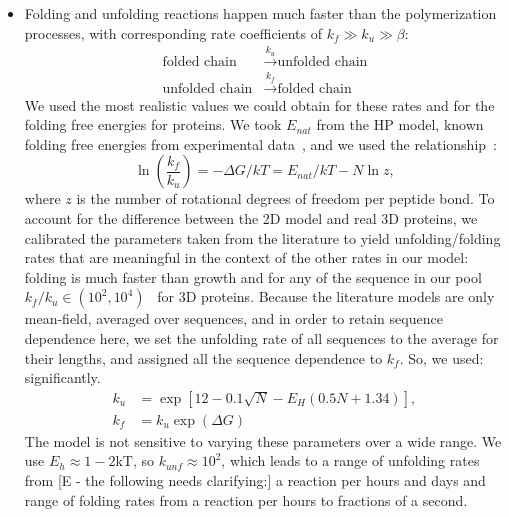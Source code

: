 \documentclass[5p,times]{elsarticle}
\newcommand*{\gD}{\Delta}
\newcommand*{\pt}[1]{\left( #1\right)}
\begin{document}
\begin{itemize}
\item Folding and unfolding reactions happen much faster than the polymerization processes, with 
corresponding rate coefficients of $k_f\gg k_{u}\gg\beta$:
\begin{equation}
\begin{split}
 \mbox{folded chain}&\xrightarrow{k_u}\mbox{unfolded chain}  \\
 \mbox{unfolded chain}&\xrightarrow{k_f}\mbox{folded chain}
\end{split}
\end{equation}
 We used the most realistic values we could obtain for these rates and for the folding free 
energies for proteins.  We took $E_{nat}$ from the HP model, known folding free energies from 
experimental data~\cite{Ghosh2010,Dill2011}, and we used the relationship~\cite{Ghosh2009}:
\begin{equation}
 \ln\pt{\frac{k_f}{k_u}}=-\gD G/kT = E_{nat}/kT-N\ln z,
\end{equation} 
 where $z$ is the number of rotational degrees of freedom per peptide bond.  To account for the 
difference between the 2D model and real 3D proteins, we calibrated the parameters taken from the 
literature to yield unfolding/folding rates that are meaningful in the context of the other rates 
in our model: folding is much faster than growth and for any of the sequence in our pool 
$k_f/k_u\in (10^2,10^4)$~\cite{Ghosh2010,Dill2011} for 3D proteins.  Because the literature models 
are only mean-field, averaged over sequences, and in order to retain sequence dependence here, we 
set the unfolding rate of all sequences to the average for their lengths, and assigned all the 
sequence dependence to $k_f$.  So, we used: 
significantly.
\begin{equation}
\begin{split}
  k_u &= \exp[12-0.1 \sqrt{N} -E_H(0.5 N + 1.34)],\\
  k_f &= k_u\exp(\gD G)
\end{split}
\end{equation}
The model is not sensitive to varying these parameters over a wide range.  We use $E_h \approx 
1-2$kT, so $k_{unf} \approx 10^2$, which leads to a range of unfolding rates from [E - the 
following needs clarifying:] a reaction per hours and days and range of folding rates from a 
reaction per hours to fractions of a second.


\end{itemize}
\end{document}
